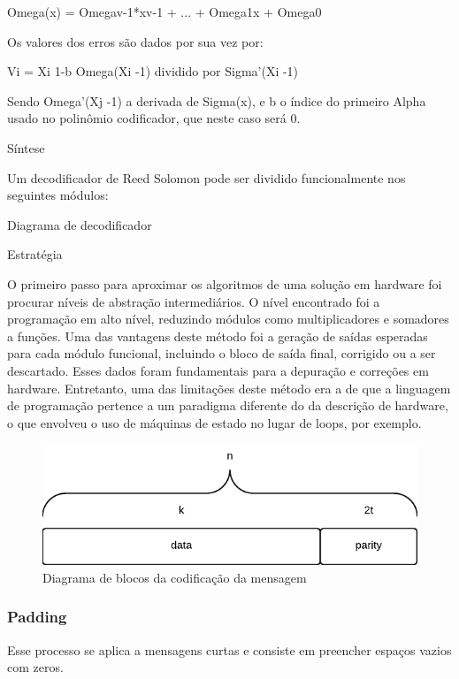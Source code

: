 	Omega(x) = Omegav-1*xv-1 + ... + Omega1x + Omega0

	Os valores dos erros são dados por sua vez por:
	
	Vi = Xi 1-b Omega(Xi -1) dividido por Sigma'(Xi -1)
	
	Sendo Omega'(Xj -1) a derivada de Sigma(x), e b o índice do primeiro Alpha usado no polinômio codificador, que neste caso será 0.
	
	Síntese
	
	Um decodificador de Reed Solomon pode ser dividido funcionalmente nos seguintes módulos:
	
	Diagrama de decodificador
	
	
	Estratégia
	
	O primeiro passo para aproximar os algoritmos de uma solução em hardware foi procurar níveis de abstração intermediários. O nível encontrado foi a programação em alto nível, reduzindo módulos como multiplicadores e somadores a funções. Uma das vantagens deste método foi a geração de saídas esperadas para cada módulo funcional, incluindo o bloco de saída final, corrigido ou a ser descartado. Esses dados foram fundamentais para a depuração e correções em hardware. Entretanto, uma das limitações deste método era a de que a linguagem de programação pertence a um paradigma diferente do da descrição de hardware, o que envolveu o uso de máquinas de estado no lugar de loops, por exemplo.  
	
	
	\cite{nasa-rs1}

	\begin{figure}[htb]
		\caption{\label{fig_reed_solomon_message} Diagrama de blocos da codificação da mensagem}
		\centering
		\includegraphics[width=0.5\textheight]{reed_solomon_message.pdf}
	\end{figure}	
	
	\subsubsection{Padding}
	
	Esse processo se aplica a mensagens curtas e consiste em preencher espaços vazios com zeros.
	

